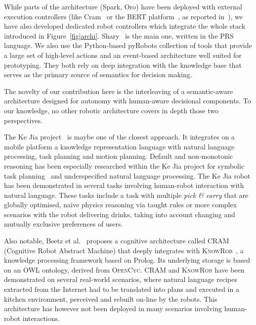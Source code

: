 \documentclass[preprint,3p,times]{elsarticle}
\begin{document}
While parts of the architecture ({\sc Spark}, {\sc Oro}) have been deployed with external
execution controllers (like {\sc Cram}~\cite{Beetz2010} or the BERT
platform~\cite{Lallee2010b}, as reported in~\cite{Lemaignan2010}), we have also
developed dedicated robot controllers which integrate the whole stack introduced
in Figure~\ref{fig|archi}. {\sc Shary}~\cite{clodic2008shary} is the main one,
written in the PRS~\cite{Ingrand1996} language. We also use the Python-based
{\sc pyRobots} collection of tools that provide a large set of high-level
actions and an event-based architecture well suited for prototyping.
They both rely on deep integration with the knowledge base that serves as the
primary source of semantics for decision making.

The novelty of our contribution here is the interleaving of a semantic-aware
architecture designed for autonomy with human-aware decisional components. To
our knowledge, no other robotic architecture covers in depth those two
perspectives.

The Ke Jia project~\cite{Chen2010} is maybe one of the closest
approach. It integrates on a mobile platform a knowledge representation language
with natural language processing, task planning and motion planning. Default and
non-monotonic reasoning has been especially researched within the Ke Jia project
for symbolic task planning~\cite{Ji2011} and underspecified natural language
processing. The Ke Jia robot has been demonstrated in several tasks involving human-robot
interaction with natural language. These tasks include a task with multiple
\emph{pick \& carry} that are globally optimised, naive physics reasoning via
taught rules or more complex scenarios with the robot delivering drinks, taking
into account changing and mutually exclusive preferences of users.

Also notable, Beetz et al.~\cite{Beetz2010} proposes a cognitive architecture
called \textsc{CRAM} (Cognitive Robot Abstract Machine) that deeply integrates
with \textsc{KnowRob}~\cite{Tenorth2009a}, a knowledge processing framework
based on Prolog. Its underlying storage is based on an OWL ontology, derived
from \textsc{OpenCyc}. \textsc{CRAM} and \textsc{KnowRob} have been demonstrated
on several real-world scenarios, where natural language recipes extracted from
the Internet had to be translated into plans and executed in a kitchen
environment, perceived and rebuilt on-line by the robots. This architecture has
however not been deployed in many scenarios involving human-robot interactions.
\end{document}
